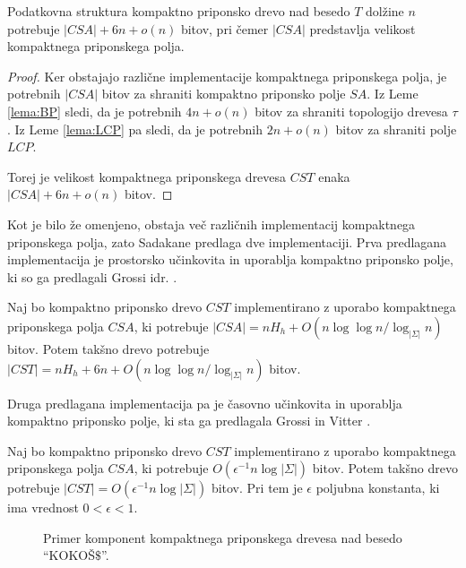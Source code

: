 \begin{izr}
    Podatkovna struktura kompaktno priponsko drevo nad besedo $T$ dolžine $n$ potrebuje $|CSA|+6n+o(n)$ bitov, pri čemer $|CSA|$ predstavlja velikost kompaktnega priponskega polja.
\end{izr}
\begin{proof}
    Ker obstajajo različne implementacije kompaktnega priponskega polja, je potrebnih $|CSA|$ bitov za shraniti kompaktno priponsko polje $SA$. Iz Leme \ref{lema:BP} sledi, da je potrebnih $4n+o(n)$ bitov za shraniti topologijo drevesa $\tau$. Iz Leme \ref{lema:LCP} pa sledi, da je potrebnih $2n+o(n)$ bitov za shraniti polje $LCP$.

    Torej je velikost kompaktnega priponskega drevesa $CST$ enaka $|CSA|+6n+o(n)$ bitov.
\end{proof}

Kot je bilo že omenjeno, obstaja več različnih implementacij kompaktnega priponskega polja, zato Sadakane \cite{Sadakane2007} predlaga dve implementaciji. Prva predlagana implementacija je prostorsko učinkovita in uporablja kompaktno priponsko polje, ki so ga predlagali Grossi idr. \cite{Grossi2003}. 

\begin{posl}\label{pos:CSAnh}
    Naj bo kompaktno priponsko drevo $CST$ implementirano z uporabo kompaktnega priponskega polja $CSA$, ki potrebuje $|CSA|=nH_h+O(n\log\log{n} / \log_{| \Sigma|}{n})$ bitov. Potem takšno drevo potrebuje $|CST| = nH_h+6n+O(n\log\log{n} / \log_{|\Sigma|}{n})$ bitov.    
\end{posl}

Druga predlagana implementacija pa je časovno učinkovita in uporablja kompaktno priponsko polje, ki sta ga predlagala Grossi in Vitter \cite{Grossi2000}. 
\begin{posl}\label{pos:CSAlog}
    Naj bo kompaktno priponsko drevo $CST$ implementirano z uporabo kompaktnega priponskega polja $CSA$, ki potrebuje $O(\epsilon^{-1}n\log{|\Sigma|})$ bitov. Potem takšno drevo potrebuje $|CST|=O(\epsilon^{-1}n\log{|\Sigma|})$ bitov. Pri tem je $\epsilon$ poljubna konstanta, ki ima vrednost $0<\epsilon<1$.
\end{posl}

\begin{figure}[htb]       
        \begin{subfigure}[t]{1\linewidth}       
            
            \centering
            \subcaption*{}
            \label{fig:neKompaktnoDrevo}
        \end{subfigure}
        \begin{subfigure}[t]{1\linewidth}        
            
            \centering
            \subcaption*{}
            \label{fig:KompaktnoPolje}
        \end{subfigure}
    \caption{Primer komponent kompaktnega priponskega drevesa nad besedo \enquote{KOKOŠ$\$$}.} 
    \label{fig:CST}
\end{figure}

